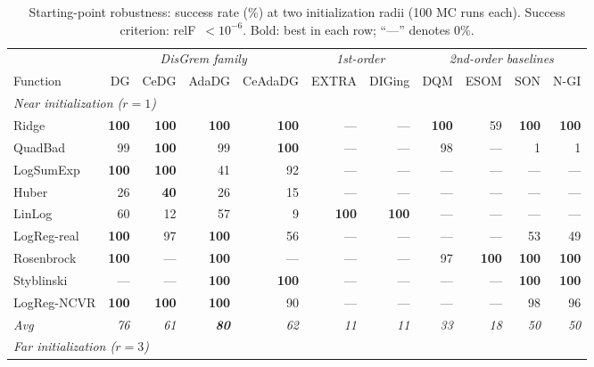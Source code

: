 \documentclass[10pt,twocolumn,letterpaper]{article}
\theoremstyle{compact}
\theoremstyle{compactremark}
\begin{document}
	\begin{table}[t]
		\centering
		\caption{Starting-point robustness: success rate (\%) at two initialization radii (100 MC runs each).
			Success criterion: relF~$<10^{-6}$.
			Bold: best in each row; ``---'' denotes 0\%.}
		\label{tab:robust}\label{tab:robust_near}\label{tab:robust_far}
		\setlength{\tabcolsep}{3pt}
		\scriptsize
		\begin{tabular}{l rrrr rr rrrr}
			\toprule
			& \multicolumn{4}{c}{\textit{DisGrem family}}
			& \multicolumn{2}{c}{\textit{1st-order}}
			& \multicolumn{4}{c}{\textit{2nd-order baselines}} \\
			\cmidrule(lr){2-5}\cmidrule(lr){6-7}\cmidrule(lr){8-11}
			Function & DG & CeDG & AdaDG & CeAdaDG
			& EXTRA & DIGing & DQM & ESOM & SON & N-GI \\
			\midrule
			\multicolumn{11}{l}{\textit{Near initialization ($r{=}1$)}} \\
			\midrule
			Ridge       & \textbf{100} & \textbf{100} & \textbf{100} & \textbf{100} & --- & --- & \textbf{100} & 59 & \textbf{100} & \textbf{100} \\
			QuadBad     & 99 & \textbf{100} & 99  & \textbf{100} & --- & --- & 98  & --- & 1   & 1   \\
			LogSumExp   & \textbf{100} & \textbf{100} & 41  & 92  & --- & --- & --- & --- & --- & --- \\
			Huber       & 26 & \textbf{40}  & 26  & 15  & --- & --- & --- & --- & --- & --- \\
			LinLog      & 60 & 12  & 57  & 9   & \textbf{100} & \textbf{100} & --- & --- & --- & --- \\
			LogReg-real & \textbf{100} & 97  & \textbf{100} & 56  & --- & --- & --- & --- & 53  & 49  \\
			Rosenbrock  & \textbf{100} & --- & \textbf{100} & --- & --- & --- & 97  & \textbf{100} & \textbf{100} & \textbf{100} \\
			Styblinski  & --- & --- & \textbf{100} & \textbf{100} & --- & --- & --- & --- & \textbf{100} & \textbf{100} \\
			LogReg-NCVR & \textbf{100} & \textbf{100} & \textbf{100} & 90  & --- & --- & --- & --- & 98  & 96  \\
			\textit{Avg} & \textit{76} & \textit{61} & \textbf{\textit{80}} & \textit{62}
			& \textit{11} & \textit{11} & \textit{33} & \textit{18}
			& \textit{50} & \textit{50} \\
			\midrule
			\multicolumn{11}{l}{\textit{Far initialization ($r{=}3$)}} \\

\end{tabular}
\end{table}
\end{document}
